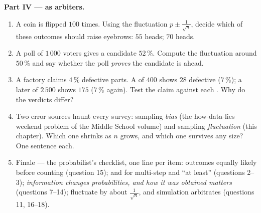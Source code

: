 \begin{problem}
\medskip
\noindent\textbf{Part IV ---  as arbiters.}
\begin{enumerate}[resume]
  \item A coin is flipped $100$ times. Using the fluctuation
         $p \pm \frac{1}{\sqrt n}$, decide which of
        these outcomes should raise eyebrows: $55$ heads; $70$
        heads.
  \item A poll of $1\,000$ voters gives a candidate $52\,\%$.
        Compute the fluctuation  around $50\,\%$ and
        say whether the poll \emph{proves} the candidate is
        ahead.
  \item A factory claims $4\,\%$ defective parts. A  of
        $400$ shows $28$ defective ($7\,\%$); a later  of
        $2\,500$ shows $175$ ($7\,\%$ again). Test the claim
        against each . Why do the verdicts differ?
  \item Two error sources haunt every survey: sampling
        \emph{bias} (the how-data-lies weekend problem of the Middle School volume) and sampling
        \emph{fluctuation} (this chapter). Which one shrinks as
        $n$ grows, and which one survives any  size? One
        sentence each.
  \item Finale --- the probabilist's checklist, one line per
        item: outcomes equally likely before counting
        (question 15);  and  for multi-step and
        ``at least'' (questions 2--3); \emph{information
        changes probabilities, and how it was obtained matters}
        (questions 7--14);  fluctuate by about
        $\frac{1}{\sqrt n}$, and simulation arbitrates
        (questions 11, 16--18).
\end{enumerate}
\end{problem}
